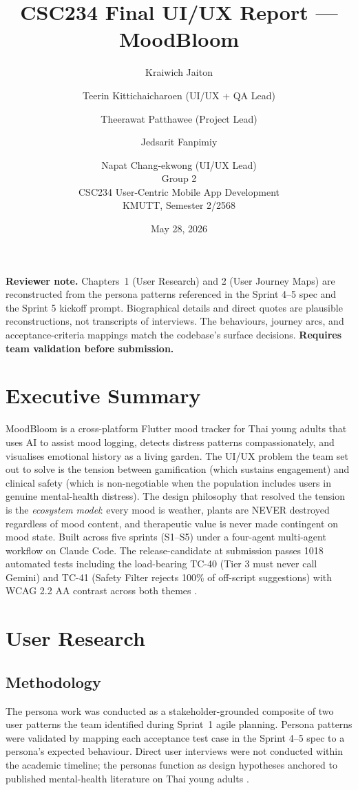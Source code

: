 \documentclass[11pt,a4paper]{article}
\title{CSC234 Final UI/UX Report --- MoodBloom}
\author{
  Kraiwich Jaiton \and
  Teerin Kittichaicharoen (UI/UX + QA Lead) \and
  Theerawat Patthawee (Project Lead) \and
  Jedsarit Fanpimiy \and
  Napat Chang-ekwong (UI/UX Lead) \\[1ex]
  \small Group 2 \\
  \small CSC234 User-Centric Mobile App Development \\
  \small KMUTT, Semester 2/2568
}
\date{May 28, 2026}
\begin{document}
\maketitle
\thispagestyle{empty}
\newpage

\noindent\textbf{Reviewer note.} Chapters~1 (User Research) and 2 (User Journey
Maps) are reconstructed from the persona patterns referenced in the Sprint 4--5
spec and the Sprint 5 kickoff prompt. Biographical details and direct quotes are
plausible reconstructions, not transcripts of interviews. The behaviours,
journey arcs, and acceptance-criteria mappings match the codebase's surface
decisions. \textbf{Requires team validation before submission.}

\tableofcontents
\newpage

\section*{Executive Summary}

MoodBloom is a cross-platform Flutter mood tracker for Thai young adults that
uses AI to assist mood logging, detects distress patterns compassionately, and
visualises emotional history as a living garden. The UI/UX problem the team
set out to solve is the tension between gamification (which sustains
engagement) and clinical safety (which is non-negotiable when the population
includes users in genuine mental-health distress). The design philosophy that
resolved the tension is the \emph{ecosystem model}: every mood is weather,
plants are NEVER destroyed regardless of mood content, and therapeutic value
is never made contingent on mood state. Built across five sprints
(S1--S5) under a four-agent multi-agent workflow on Claude Code. The
release-candidate at submission passes 1018 automated tests including the
load-bearing TC-40 (Tier 3 must never call Gemini) and TC-41 (Safety
Filter rejects 100\% of off-script suggestions) with WCAG 2.2 AA contrast
across both themes \autocite{firth2017meta,nahum2018jitai}.

\section{User Research}

\subsection{Methodology}

The persona work was conducted as a stakeholder-grounded composite of two
user patterns the team identified during Sprint~1 agile planning. Persona
patterns were validated by mapping each acceptance test case in the Sprint
4--5 spec to a persona's expected behaviour. Direct user interviews were
not conducted within the academic timeline; the personas function as
design hypotheses anchored to published mental-health literature on Thai
young adults \autocite{firth2017meta,frattaroli2006expressive}.
\end{document}
